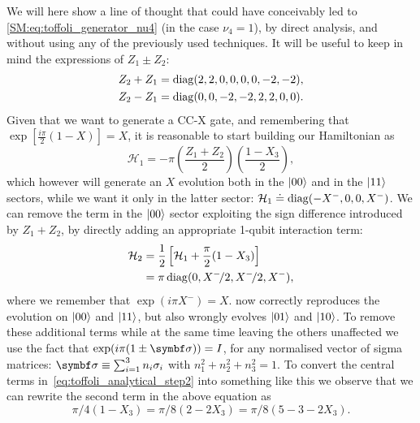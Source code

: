 We will here show a line of thought that could have conceivably led to \cref{SM:eq:toffoli_generator_nu4} (in the case $\nu_4=1$), by direct analysis, and without using any of the previously used techniques.
It will be useful to keep in mind the expressions of $Z_1 \pm Z_2$:
\begin{equation}
\begin{aligned}
	Z_2 + Z_1 &= \operatorname{diag}(2, 2, 0, 0, 0, 0, -2, -2), \\
	Z_2 - Z_1 &= \operatorname{diag}(0, 0, -2, -2, 2, 2, 0, 0).
\end{aligned}
\end{equation}
Given that we want to generate a CC-X gate, and remembering that
$\exp\left[\frac{i\pi}{2}(1-X)\right] = X$, it is reasonable to start building our Hamiltonian as
\begin{equation}
	\mathcal H_1 = - \pi \left(\frac{Z_1+Z_2}{2}\right)\left(\frac{1-X_3}{2}\right),
\end{equation}
which however will generate an $X$ evolution both in the $\ket{00}$ and in the $\ket{11}$ sectors, while we want it only in the latter sector:
	$\mathcal H_1 \doteq \operatorname{diag}(-X^-, 0, 0, X^-)$.
We can remove the term in the $\ket{00}$ sector exploiting the sign difference introduced by $Z_1 + Z_2$, by directly adding an appropriate 1-qubit interaction term:
\begin{equation}
\begin{aligned}
	\mathcal H_2 &= \frac{1}{2} \left[ \mathcal H_1 + \frac{\pi}{2} (1 - X_3) \right] \\
				 &= \pi \operatorname{diag}(0, X^-\!/2, X^-\!/2, X^-),
\end{aligned}
\label{eq:toffoli_analytical_step2}
\end{equation}
where we remember that $\exp(i\pi X^-) = X$.
 now correctly reproduces the evolution on $\ket{00}$ and $\ket{11}$, but also wrongly evolves $\ket{01}$ and $\ket{10}$.
To remove these additional terms while at the same time leaving the others unaffected we use the fact that
$\exp(i\pi (1 \pm \bs{\sigma})) = I$, for any normalised vector of sigma matrices: $\bs\sigma \equiv \sum_{i=1}^3 n_i \sigma_i$ with $n_1^2 + n_2^2 + n_3^2 = 1$.
To convert the central terms in~\cref{eq:toffoli_analytical_step2} into something like this we observe that we can rewrite the second term in the above equation as
\begin{equation}
	\pi/4(1-X_3) = \pi/8(2 - 2 X_3) = \pi/8(5 - 3 - 2 X_3).
\end{equation}
